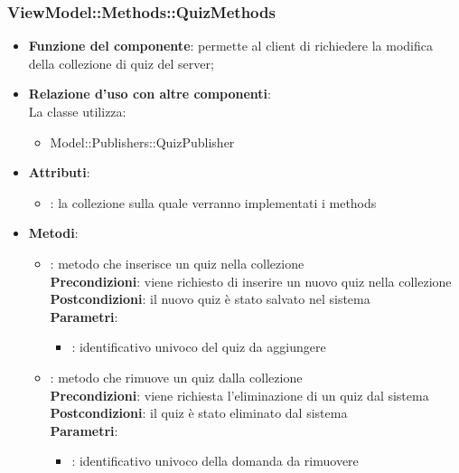 \subsubsection{ViewModel::Methods::QuizMethods}
\begin{itemize}
\item\textbf{Funzione del componente}: permette al client di richiedere la modifica della collezione di quiz del server;
	\item\textbf{Relazione d'uso con altre componenti}: \\
La classe utilizza:
	\begin{itemize}
		\item Model::Publishers::QuizPublisher
	\end{itemize}
\item\textbf{Attributi}:
	\begin{itemize}
		\item{}: la collezione sulla quale verranno implementati i methods\\
	\end{itemize}
\item\textbf{Metodi}:
	\begin{itemize}
		\item{}: metodo che inserisce un quiz nella collezione\\
		\textbf{Precondizioni}: viene richiesto di inserire un nuovo quiz nella collezione\\
		\textbf{Postcondizioni}: il nuovo quiz è stato salvato nel sistema\\
		\textbf{Parametri}:
			\begin{itemize}
				\item{}: identificativo univoco del quiz da aggiungere\\
			\end{itemize}
		\item{}: metodo che rimuove un quiz dalla collezione\\
		\textbf{Precondizioni}: viene richiesta l'eliminazione di un quiz dal sistema\\
		\textbf{Postcondizioni}: il quiz è stato eliminato dal sistema\\
		\textbf{Parametri}:
			\begin{itemize}
				\item{}: identificativo univoco della domanda da rimuovere\\
			\end{itemize}
	\end{itemize}
\end{itemize}

